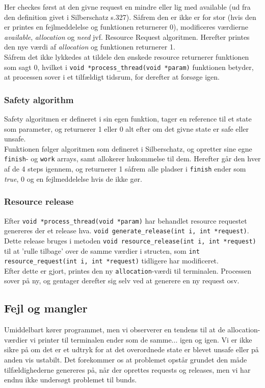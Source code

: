 \documentclass[main.tex]{subfile}
\begin{document}
Her checkes først at den givne request en mindre eller lig med available (ud fra den definition givet i Silberschatz s.327). Såfrem den er ikke er for stor (hvis den er printes en fejlmeddelelse og funktionen returnerer 0), modificeres værdierne \textit{available}, \textit{allocation} og \textit{need} jvf. Resource Request algoritmen. Herefter printes den nye værdi af \textit{allocation} og funktionen returnerer 1.\\

Såfrem det ikke lykkedes at tildele den ønskede resource returnerer funktionen som sagt 0, hvilket i \texttt{void *process\_thread(void *param)} funktionen betyder, at processen sover i et tilfældigt tidsrum, for derefter at forsøge igen.

\subsubsection{Safety algorithm}
Safety algoritmen er defineret i sin egen funktion, tager en reference til et state som parameter, og returnerer 1 eller 0 alt efter om det givne state er safe eller unsafe.\\

Funktionen følger algoritmen som defineret i Silberschatz, og opretter sine egne \texttt{finish}- og \texttt{work} arrays, samt allokerer hukommelse til dem. Herefter går den hver af de 4 steps igennem, og returnerer 1 såfrem alle pladser i \texttt{finish} ender som \textit{true}, 0 og en fejlmeddelelse hvis de ikke gør.

\subsubsection{Resource release}
Efter \texttt{void *process\_thread(void *param)} har behandlet resource requestet genereres der et release hva. \texttt{void generate\_release(int i, int *request)}. Dette release bruges i metoden \texttt{void resource\_release(int i, int *request)} til at 'rulle tilbage' over de samme værdier i structen, som \texttt{int resource\_request(int i, int *request)} tidligere har modificeret.\\

Efter dette er gjort, printes den ny \texttt{allocation}-værdi til terminalen. Processen sover på ny, og gentager derefter sig selv ved at generere en ny request osv.

\subsection{Fejl og mangler}
Umiddelbart kører programmet, men vi observerer en tendens til at de allocation-værdier vi printer til terminalen ender som de samme... igen og igen. Vi er ikke sikre på om det er et udtryk for at det overordnede state er blevet unsafe eller på anden vis ustabilt. Det forekommer os at problemet opstår grundet den måde tilfældighederne genereres på, når der oprettes requests og releases, men vi har endnu ikke undersøgt problemet til bunds.\\
\end{document}
